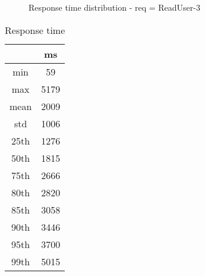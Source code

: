 \begin{minipage}{0.75\linewidth}
\begin{figure}[h]
\begin{adjustbox}{max width=1.0\linewidth, keepaspectratio}
  \end{adjustbox}
  \caption{Response time distribution - req = ReadUser-3}
\end{figure}
\end{minipage}\hfill\begin{minipage}{0.18\linewidth}
\begin{table}[h]
\begin{tabular}{|cc|}
\hline
\textbf{} & \textbf{ms}\\ \hline
 \Xhline{0.005\arrayrulewidth}
min & 59\\
 \Xhline{0.005\arrayrulewidth}
max & 5179\\
 \Xhline{0.005\arrayrulewidth}
mean & 2009\\
 \Xhline{0.005\arrayrulewidth}
std & 1006\\
\hline
\hline
 \Xhline{0.005\arrayrulewidth}
25th & 1276\\
 \Xhline{0.005\arrayrulewidth}
50th & 1815\\
 \Xhline{0.005\arrayrulewidth}
75th & 2666\\
 \Xhline{0.005\arrayrulewidth}
80th & 2820\\
 \Xhline{0.005\arrayrulewidth}
85th & 3058\\
 \Xhline{0.005\arrayrulewidth}
90th & 3446\\
 \Xhline{0.005\arrayrulewidth}
95th & 3700\\
 \Xhline{0.005\arrayrulewidth}
99th & 5015\\
\hline
\end{tabular}
\caption{Response time}
\end{table}
\end{minipage}\hfill